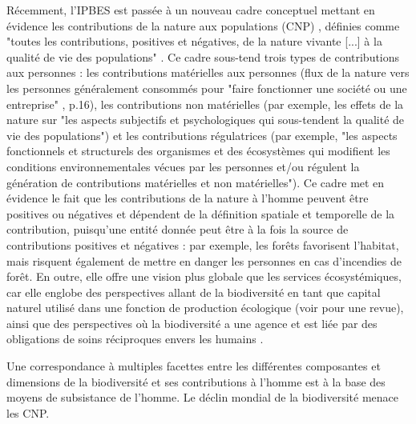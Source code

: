 Récemment, l'IPBES est passée à un nouveau cadre conceptuel mettant en évidence les contributions de la nature aux populations (CNP) \citep{DIAZ20151}, définies comme "toutes les contributions, positives et négatives, de la nature vivante [...] à la qualité de vie des populations" \citep{diaz_2018}. Ce cadre sous-tend trois types de contributions aux personnes : les contributions matérielles aux personnes (flux de la nature vers les personnes généralement consommés pour "faire fonctionner une société ou une entreprise" \cite{ipbes_2022_6417333}, p.16), les contributions non matérielles (par exemple, les effets de la nature sur "les aspects subjectifs et psychologiques qui sous-tendent la qualité de vie des populations") et les contributions régulatrices (par exemple, "les aspects fonctionnels et structurels des organismes et des écosystèmes qui modifient les conditions environnementales vécues par les personnes et/ou régulent la génération de contributions matérielles et non matérielles"). Ce cadre met en évidence le fait que les contributions de la nature à l'homme peuvent être positives ou négatives et dépendent de la définition spatiale et temporelle de la contribution, puisqu'une entité donnée peut être à la fois la source de contributions positives et négatives : par exemple, les forêts favorisent l'habitat, mais risquent également de mettre en danger les personnes en cas d'incendies de forêt. En outre, elle offre une vision plus globale que les services écosystémiques, car elle englobe des perspectives allant de la biodiversité en tant que capital naturel utilisé dans une fonction de production écologique (voir \cite{polasky_integrating_2009} pour une revue), ainsi que des perspectives où la biodiversité a une agence et est liée par des obligations de soins réciproques envers les humains \citep{descola}. 

Une correspondance à multiples facettes entre les différentes composantes et dimensions de la biodiversité et ses contributions à l'homme est à la base des moyens de subsistance de l'homme. Le déclin mondial de la biodiversité menace les CNP.

